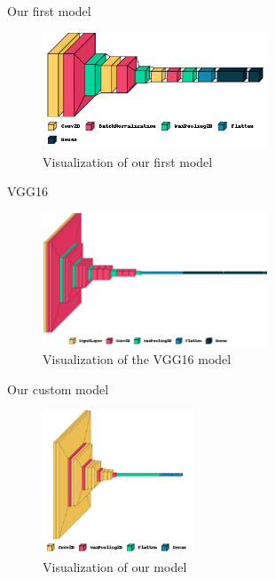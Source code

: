 \documentclass[aspectratio=169]{beamer}
\begin{document}
{    \begin{frame}{Our first model}
        \begin{figure}
            \centering
            \includegraphics[width=0.6\textwidth]{img/model_without_dropout.png}
            \caption{Visualization of our first model}
        \end{figure}
    \end{frame}


    \begin{frame}{VGG16 \cite{VGG16}}
        \begin{figure}
            \centering
            \includegraphics[width=0.6\textwidth]{img/model_VGG16.png}
            \caption{Visualization of the VGG16 model}
        \end{figure}
    \end{frame}

    \begin{frame}{Our custom model}
        \begin{figure}
            \centering
            \includegraphics[width=0.4\textwidth]{img/model_dropout_false_batchnorm_false.png}
            \caption{Visualization of our model}
        \end{figure}
    \end{frame}

}
\end{document}
